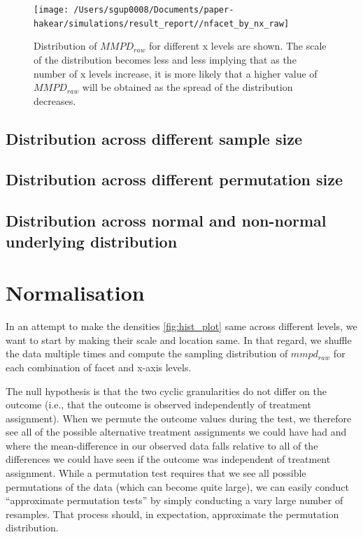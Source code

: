 \documentclass[
]{article}
\begin{document}
\begin{figure}

{\centering \texttt{[image: /Users/sgup0008/Documents/paper-hakear/simulations/result\_report//nfacet\_by\_nx\_raw]} 

}

\caption{Distribution of $MMPD_{raw}$ for different x levels are shown. The scale of the distribution becomes less and less implying that as the number of x levels increase, it is more likely that a higher value of $MMPD_{raw}$ will be obtained as the spread of the distribution decreases. }\label{fig:dist-across-x}
\end{figure}

\hypertarget{distribution-across-different-sample-size}{%
\subsection{Distribution across different sample size}\label{distribution-across-different-sample-size}}

\hypertarget{distribution-across-different-permutation-size}{%
\subsection{Distribution across different permutation size}\label{distribution-across-different-permutation-size}}

\hypertarget{distribution-across-normal-and-non-normal-underlying-distribution}{%
\subsection{Distribution across normal and non-normal underlying distribution}\label{distribution-across-normal-and-non-normal-underlying-distribution}}

\hypertarget{normalisation}{%
\section{Normalisation}\label{normalisation}}

In an attempt to make the densities \ref{fig:hist_plot} same across different levels, we want to start by making their scale and location same. In that regard, we shuffle the data multiple times and compute the sampling distribution of \(mmpd_{raw}\) for each combination of facet and x-axis levels.

The null hypothesis is that the two cyclic granularities do not differ on the outcome (i.e., that the outcome is observed independently of treatment assignment). When we permute the outcome values during the test, we therefore see all of the possible alternative treatment assignments we could have had and where the mean-difference in our observed data falls relative to all of the differences we could have seen if the outcome was independent of treatment assignment. While a permutation test requires that we see all possible permutations of the data (which can become quite large), we can easily conduct ``approximate permutation tests'' by simply conducting a vary large number of resamples. That process should, in expectation, approximate the permutation distribution.
\end{document}
